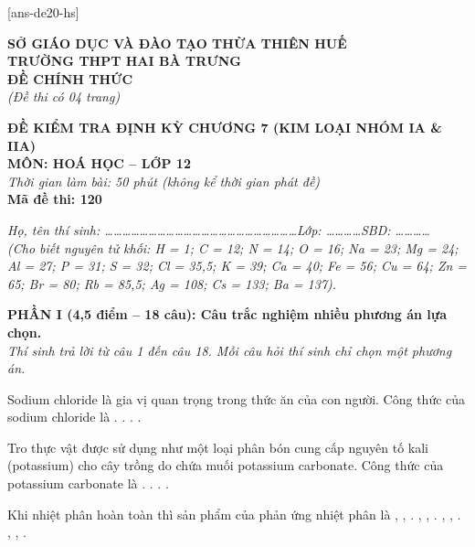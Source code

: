 \documentclass[11pt,a4paper]{article}
\def\loigiai#1{}
\begin{document}
[ans-de20-hs]

\noindent
\begin{minipage}[t]{0.48\textwidth}
	\textbf{SỞ GIÁO DỤC VÀ ĐÀO TẠO THỪA THIÊN HUẾ}\\
	\textbf{TRƯỜNG THPT HAI BÀ TRƯNG}\\
	\textbf{ĐỀ CHÍNH THỨC}\\
	\textit{(Đề thi có 04 trang)}
\end{minipage}\hfill
\begin{minipage}[t]{0.48\textwidth}
	\raggedleft
	\textbf{\color{mainGreen}ĐỀ KIỂM TRA ĐỊNH KỲ CHƯƠNG 7 (KIM LOẠI NHÓM IA \& IIA)}\\
	\textbf{MÔN: HOÁ HỌC -- LỚP 12}\\
	\textit{Thời gian làm bài: 50 phút (không kể thời gian phát đề)}\\
	\textbf{Mã đề thi: 120}
\end{minipage}


\vspace{1pt}
\noindent\textit{Họ, tên thí sinh: \dots\dots\dots\dots\dots\dots\dots\dots\dots\dots\dots\dots\dots\dots\dots\dots\dots\dots\dots\dots\dots\dots Lớp: \dots\dots\dots\dots SBD: \dots\dots\dots\dots}\\
\noindent\textit{(Cho biết nguyên tử khối: H = 1; C = 12; N = 14; O = 16; Na = 23; Mg = 24; Al = 27; P = 31; S = 32; Cl = 35,5; K = 39; Ca = 40; Fe = 56; Cu = 64; Zn = 65; Br = 80; Rb = 85,5; Ag = 108; Cs = 133; Ba = 137).}

\vspace{1pt}
\noindent
\textbf{PHẦN I (4,5 điểm -- 18 câu): Câu trắc nghiệm nhiều phương án lựa chọn.}\\
\textit{Thí sinh trả lời từ câu 1 đến câu 18. Mỗi câu hỏi thí sinh chỉ chọn một phương án.}

\begin{ex}
Sodium chloride là gia vị quan trọng trong thức ăn của con người. Công thức của sodium chloride là
\choice
{.}
{.}
{.}
{.}
\loigiai{}
\end{ex}

\begin{ex}
Tro thực vật được sử dụng như một loại phân bón cung cấp nguyên tố kali (potassium) cho cây trồng do chứa muối potassium carbonate. Công thức của potassium carbonate là
\choice
{.}
{.}
{.}
{.}
\loigiai{}
\end{ex}

\begin{ex}
Khi nhiệt phân hoàn toàn  thì sản phẩm của phản ứng nhiệt phân là
\choice
{, , .}
{, , .}
{, , .}
{, , .}
\loigiai{}
\end{ex}
\end{document}
